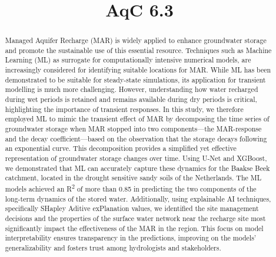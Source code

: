 \documentclass[
]{agujournal2019}
\begin{document}
\title{AqC 6.3}



\begin{abstract}
Managed Aquifer Recharge (MAR) is widely applied to enhance groundwater
storage and promote the sustainable use of this essential resource.
Techniques such as Machine Learning (ML) as surrogate for
computationally intensive numerical models, are increasingly considered
for identifying suitable locations for MAR. While ML has been
demonstrated to be suitable for steady-state simulations, its
application for transient modelling is much more challenging. However,
understanding how water recharged during wet periods is retained and
remains available during dry periods is critical, highlighting the
importance of transient responses. In this study, we therefore employed
ML to mimic the transient effect of MAR by decomposing the time series
of groundwater storage when MAR stopped into two components---the
MAR-response and the decay coefficient---based on the observation that
the storage decays following an exponential curve. This decomposition
provides a simplified yet effective representation of groundwater
storage changes over time. Using U-Net and XGBoost, we demonstrated that
ML can accurately capture these dynamics for the Baakse Beek catchment,
located in the drought sensitive sandy soils of the Netherlands. The ML
models achieved an R\textsuperscript{2} of more than 0.85 in predicting
the two components of the long-term dynamics of the stored water.
Additionally, using explainable AI techniques, specifically SHapley
Aditive exPlanation values, we identified the site management decisions
and the properties of the surface water network near the recharge site
most significantly impact the effectiveness of the MAR in the region.
This focus on model interpretability ensures transparency in the
predictions, improving on the models' generalizability and fosters trust
among hydrologists and stakeholders.
\end{abstract}
\end{document}
